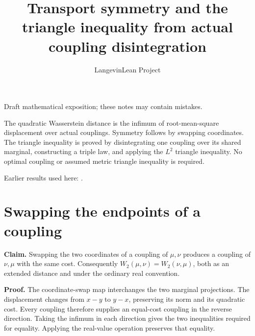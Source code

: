 \documentclass[11pt,a4paper]{article}
\title{\texorpdfstring{Transport symmetry and the triangle inequality from actual coupling disintegration}{Transport symmetry and the triangle inequality from actual coupling disintegration}}
\author{LangevinLean Project}
\date{}
\begin{document}
\maketitle
Draft mathematical exposition; these notes may contain mistakes.


The quadratic Wasserstein distance is the infimum of root-mean-square displacement over actual couplings. Symmetry follows by swapping coordinates. The triangle inequality is proved by disintegrating one coupling over its shared marginal, constructing a triple law, and applying the \(L^2\) triangle inequality. No optimal coupling or assumed metric triangle inequality is required.



Earlier results used here: \cite[Section~3.22]{LangevinLean2026ULASC}.

\section{\texorpdfstring{Swapping the endpoints of a coupling}{Swapping the endpoints of a coupling}}


\textbf{Claim.} Swapping the two coordinates of a coupling of \(\mu,\nu\) produces a coupling of \(\nu,\mu\) with the same cost. Consequently \(W_2(\mu,\nu)=W_2(\nu,\mu)\), both as an extended distance and under the ordinary real convention.




\textbf{Proof.} The coordinate-swap map interchanges the two marginal projections. The displacement changes from \(x-y\) to \(y-x\), preserving its norm and its quadratic cost. Every coupling therefore supplies an equal-cost coupling in the reverse direction. Taking the infimum in each direction gives the two inequalities required for equality. Applying the real-value operation preserves that equality.
\end{document}
